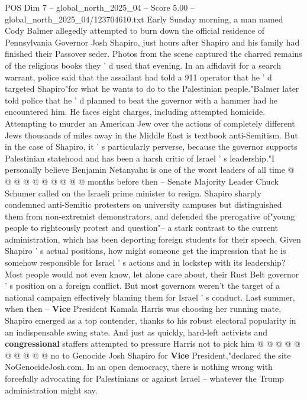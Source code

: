 \begin{textsample}{POS Dim 7 – global\_north\_2025\_04 – Score 5.00 – global\_north\_2025\_04/123704610.txt}  \label{ex:f7_pos_366}
Early Sunday morning, a man named Cody Balmer allegedly attempted to burn down the official residence of Pennsylvania Governor Josh Shapiro, just hours after Shapiro and his family had finished their Passover seder.
Photos from the scene captured the charred remains of the religious books they ' d used that evening.
In an affidavit for a search warrant, police said that the assailant had told a 911 operator that he ' d targeted Shapiro"for what he wants to do to the Palestinian people."Balmer later told police that he ' d planned to beat the governor with a hammer had he encountered him.
He faces eight charges, including attempted homicide.
Attempting to murder an American Jew over the actions of completely different Jews thousands of miles away in the Middle East is textbook anti-Semitism.
But in the case of Shapiro, it ' s particularly perverse, because the governor supports Palestinian statehood and has been a harsh critic of Israel ' s leadership."I personally believe Benjamin Netanyahu is one of the worst leaders of all time @ @ @ @ @ @ @ @ @ @ months before then -- Senate Majority Leader Chuck Schumer called on the Israeli prime minister to resign.
Shapiro sharply condemned anti-Semitic protesters on university campuses but distinguished them from non-extremist demonstrators, and defended the prerogative of"young people to righteously protest and question"-- a stark contrast to the current administration, which has been deporting foreign students for their speech.
Given Shapiro ' s actual positions, how might someone get the impression that he is somehow responsible for Israel ' s actions and in lockstep with its leadership?
Most people would not even know, let alone care about, their Rust Belt governor ' s position on a foreign conflict.
But most governors weren't the target of a national campaign effectively blaming them for Israel ' s conduct.
Last summer, when then -- \textbf{Vice} President Kamala Harris was choosing her running mate, Shapiro emerged as a top contender, thanks to his robust electoral popularity in an indispensable swing state.
And just as quickly, hard-left activists and \textbf{congressional} staffers attempted to pressure Harris not to pick him @ @ @ @ @ @ @ @ @ @ no to Genocide Josh Shapiro for \textbf{Vice} President,"declared the site NoGenocideJosh.com.
In an open democracy, there is nothing wrong with forcefully advocating for Palestinians or against Israel -- whatever the Trump administration might say.

\end{textsample}
